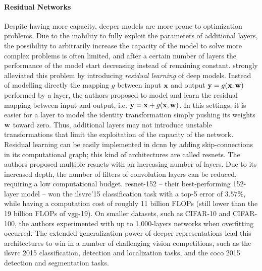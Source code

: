 \paragraph{Residual Networks}
Despite having more capacity, deeper models are more prone to optimization problems.
Due to the inability to fully exploit the parameters of additional layers, the possibility to arbitrarily increase the capacity of the model to solve more complex problems is often limited, and after a certain number of layers the performance of the model start decreasing instead of remaining constant.
\citet{he2016deep} strongly alleviated this problem by introducing \emph{residual learning} of deep models.
Instead of modelling directly the mapping $g$ between input $\mathbf{x}$ and output $\mathbf{y} = g(\mathbf{x}, \mathbf{w})$ performed by a layer, the authors proposed to model and learn the residual mapping between input and output, i.e. $\mathbf{y} = \mathbf{x} + g(\mathbf{x}, \mathbf{w})$.
In this settings, it is easier for a layer to model the identity transformation simply pushing its weights $\mathbf{w}$ toward zero.
Thus, additional layers may not introduce unstable transformations that limit the exploitation of the capacity of the network.
Residual learning can be easily implemented in \gls{dcnn} by adding skip-connections in its computational graph;
this kind of architectures are called \glspl{resnet}.
The authors proposed multiple \glspl{resnet} with an increasing number of layers.
Due to its increased depth, the number of filters of convolution layers can be reduced, requiring a low computational budget.
\gls{resnet}-152 -- their best-performing 152-layer model -- won the \gls{ilsvrc}'15 classification task with a top-5 error of $3.57 \%$, while having a computation cost of roughly 11 billion FLOPs (still lower than the 19 billion FLOPs of \gls{vgg}-19).
On smaller datasets, such as CIFAR-10 and CIFAR-100, the authors experimented with up to 1,000-layers networks when overfitting occurred.
The extended generalization power of deeper representations lead this architectures to win in a number of challenging vision competitions, such as the \gls{ilsvrc} 2015 classification, detection and localization tasks, and the \acrshort{coco} 2015 detection and segmentation tasks.

